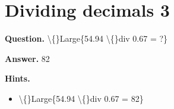 \documentclass{article}
\begin{document}
\section*{Dividing decimals 3}
\textbf{Question.} \textbackslash\{\}Large\{54.94 \textbackslash\{\}div
                    0.67 = ?\}

\textbf{Answer.} 82

\textbf{Hints.}
\begin{itemize}
  \item \textbackslash\{\}Large\{54.94 \textbackslash\{\}div
                        0.67 =
                        82\}
\end{itemize}
\end{document}
